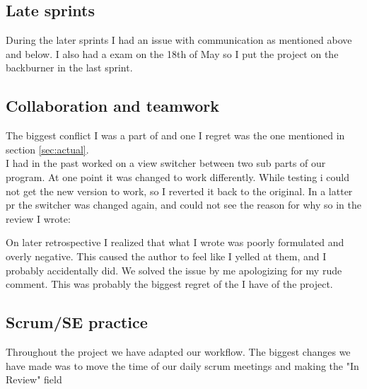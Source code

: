\documentclass{article}
\begin{document}
\subsection{Late sprints}
During the later sprints I had an issue with communication as mentioned above and below.
I also had a exam on the 18th of May so I put the project on the backburner in the last sprint.
\subsection{Collaboration and teamwork}
The biggest conflict I was a part of and one I regret was the one mentioned in section \ref{sec:actual}.\\
I had in the past worked on a view switcher between two sub parts of our program. At one point it was changed to work differently. While testing i could not get the new version to work, so I reverted it back to the original. In a latter pr the switcher was changed again, and could not see the reason for why so in the review I wrote:


On later retrospective I realized that what I wrote was poorly formulated and overly negative. 
This caused the author to feel like I yelled at them, and I probably accidentally did.
We solved the issue by me apologizing for my rude comment. 
This was probably the biggest regret of the I have of the project.
\subsection{Scrum/SE practice}
Throughout the project we have adapted our workflow. The biggest changes we have made was to move the time of our daily scrum meetings and making the "In Review" field 

\newpage


\end{document}
